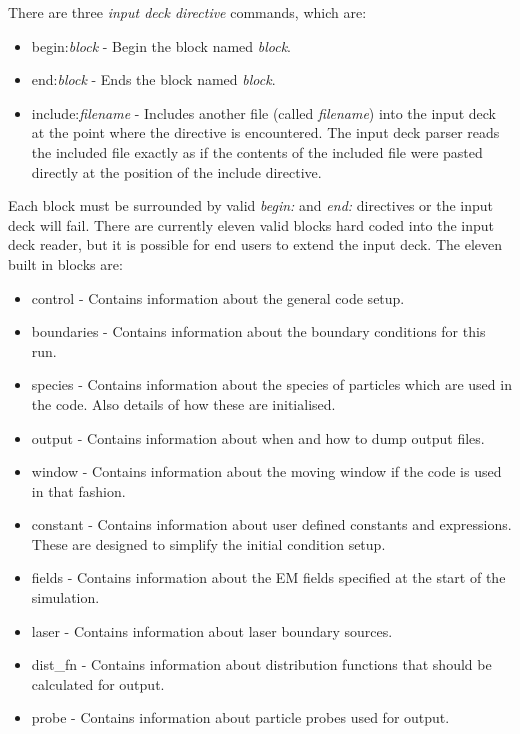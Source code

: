 \documentclass[12pt,a4paper]{article}
\begin{document}
There are three {\it input deck directive} commands, which are:
\begin{itemize}
\item begin:{\it block} - Begin the block named {\it block}.
\item end:{\it block} - Ends the block named {\it block}.
\item include:{\it filename} - Includes another file (called {\it filename})
  into the input deck at the point where the directive is encountered. The
  input deck parser reads the included file exactly as if the contents of the
  included file were pasted directly at the position of the include directive.
\end{itemize}
Each block must be surrounded by valid {\it begin:} and {\it end:} directives
or the input deck will fail. There are currently eleven valid blocks hard
coded into the input deck reader, but it is possible for end users to extend
the input deck. The eleven built in blocks are:
\begin{itemize}
\item control - Contains information about the general code setup.
\item boundaries - Contains information about the boundary conditions for this
  run.
\item species - Contains information about the species of particles which are
  used in the code. Also details of how these are initialised.
\item output - Contains information about when and how to dump output files.
\item window - Contains information about the moving window if the code is
  used in that fashion.
\item constant - Contains information about user defined constants and
  expressions. These are designed to simplify the initial condition setup.
\item fields - Contains information about the EM fields specified at the
  start of the simulation.
\item laser - Contains information about laser boundary sources.
\item dist\_fn - Contains information about distribution functions that should
  be calculated for output.
\item probe - Contains information about particle probes used for output.
\end{itemize}
\end{document}
